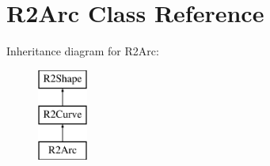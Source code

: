 \hypertarget{class_r2_arc}{}\section{R2\+Arc Class Reference}
\label{class_r2_arc}
Inheritance diagram for R2\+Arc\+:\begin{figure}[H]
\begin{center}
\leavevmode
\includegraphics[height=3.000000cm]{class_r2_arc}
\end{center}
\end{figure}
